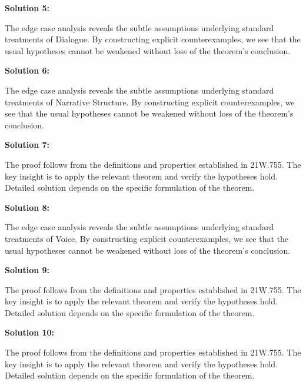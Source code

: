 \documentclass[12pt,a4paper]{exam}
\begin{document}
\vspace{0.5cm}

\textbf{Solution 5:}

The edge case analysis reveals the subtle assumptions underlying standard treatments of Dialogue. By constructing explicit counterexamples, we see that the usual hypotheses cannot be weakened without loss of the theorem's conclusion.

\vspace{0.5cm}

\textbf{Solution 6:}

The edge case analysis reveals the subtle assumptions underlying standard treatments of Narrative Structure. By constructing explicit counterexamples, we see that the usual hypotheses cannot be weakened without loss of the theorem's conclusion.

\vspace{0.5cm}

\textbf{Solution 7:}

The proof follows from the definitions and properties established in 21W.755. The key insight is to apply the relevant theorem and verify the hypotheses hold. Detailed solution depends on the specific formulation of the theorem.

\vspace{0.5cm}

\textbf{Solution 8:}

The edge case analysis reveals the subtle assumptions underlying standard treatments of Voice. By constructing explicit counterexamples, we see that the usual hypotheses cannot be weakened without loss of the theorem's conclusion.

\vspace{0.5cm}

\textbf{Solution 9:}

The proof follows from the definitions and properties established in 21W.755. The key insight is to apply the relevant theorem and verify the hypotheses hold. Detailed solution depends on the specific formulation of the theorem.

\vspace{0.5cm}

\textbf{Solution 10:}

The proof follows from the definitions and properties established in 21W.755. The key insight is to apply the relevant theorem and verify the hypotheses hold. Detailed solution depends on the specific formulation of the theorem.

\vspace{0.5cm}
\end{document}
